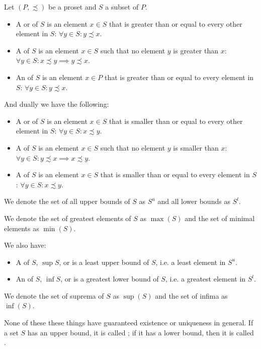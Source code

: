 \begin{definition}
Let $(P,\precsim)$ be a proset and $S$ a subset of $P$.
\begin{itemize}
\item A  or  of $S$ is an element $x\in S$ that is greater than or equal to every other element in $S$: $\forall y\in S: y\precsim x$.
\item A  of $S$ is an element $x\in S$ such that no element $y$ is greater than $x$: $\forall y\in S: x\precsim y \implies y \precsim x$.
\item An  of $S$ is an element $x\in P$ that is greater than or equal to every element in $S$: $\forall y\in S: y\precsim x$.
\end{itemize}
And dually we have the following:
\begin{itemize}
\item A  or  of $S$ is an element $x\in S$ that is smaller than or equal to every other element in $S$: $\forall y\in S: x\precsim y$.
\item A  of $S$ is an element $x\in S$ such that no element $y$ is smaller than $x$: $\forall y\in S: y\precsim x \implies x \precsim y$.
\item A  of $S$ is an element $x\in S$ that is smaller than or equal to every element in $S$: $\forall y\in S: x\precsim y$.
\end{itemize}
We denote the set of all upper bounds of $S$ as $S^u$ and all lower bounds as $S^l$.

We denote the set of greatest elements of $S$ as $\max(S)$ and the set of minimal elements as $\min(S)$.

We also have:
\begin{itemize}
\item A  of $S$, $\sup S$, or  is a least upper bound of $S$, i.e. a least element in $S^u$.
\item An  of $S$, $\inf S$, or  is a greatest lower bound of $S$, i.e. a greatest element in $S^l$.
\end{itemize}
We denote the set of suprema of $S$ as $\sup(S)$ and the set of infima as $\inf(S)$.
\end{definition}
None of these these things have guaranteed existence or uniqueness in general. If a set $S$ has an upper bound, it is called ; if it has a lower bound, then it is called .

